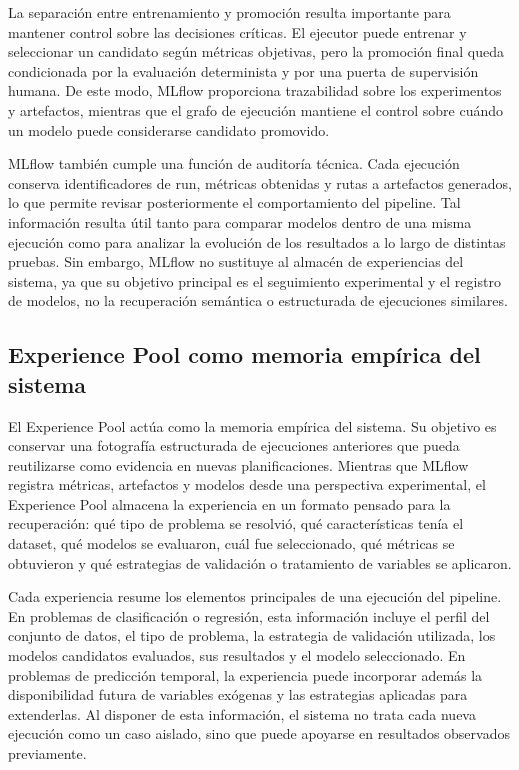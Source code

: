 \documentclass[12pt,a4paper]{article}
\theoremstyle{plain}
\begin{document}
La separación entre entrenamiento y promoción resulta importante para mantener control sobre las decisiones críticas. El ejecutor puede entrenar y seleccionar un candidato según métricas objetivas, pero la promoción final queda condicionada por la evaluación determinista y por una puerta de supervisión humana. De este modo, MLflow proporciona trazabilidad sobre los experimentos y artefactos, mientras que el grafo de ejecución mantiene el control sobre cuándo un modelo puede considerarse candidato promovido.

MLflow también cumple una función de auditoría técnica. Cada ejecución conserva identificadores de run, métricas obtenidas y rutas a artefactos generados, lo que permite revisar posteriormente el comportamiento del pipeline. Tal información resulta útil tanto para comparar modelos dentro de una misma ejecución como para analizar la evolución de los resultados a lo largo de distintas pruebas. Sin embargo, MLflow no sustituye al almacén de experiencias del sistema, ya que su objetivo principal es el seguimiento experimental y el registro de modelos, no la recuperación semántica o estructurada de ejecuciones similares.

\subsection{Experience Pool como memoria empírica del sistema}
\label{sec:experience-pool-arquitectura}

El Experience Pool actúa como la memoria empírica del sistema. Su objetivo es conservar una fotografía estructurada de ejecuciones anteriores que pueda reutilizarse como evidencia en nuevas planificaciones. Mientras que MLflow registra métricas, artefactos y modelos desde una perspectiva experimental, el Experience Pool almacena la experiencia en un formato pensado para la recuperación: qué tipo de problema se resolvió, qué características tenía el dataset, qué modelos se evaluaron, cuál fue seleccionado, qué métricas se obtuvieron y qué estrategias de validación o tratamiento de variables se aplicaron.

Cada experiencia resume los elementos principales de una ejecución del pipeline. En problemas de clasificación o regresión, esta información incluye el perfil del conjunto de datos, el tipo de problema, la estrategia de validación utilizada, los modelos candidatos evaluados, sus resultados y el modelo seleccionado. En problemas de predicción temporal, la experiencia puede incorporar además la disponibilidad futura de variables exógenas y las estrategias aplicadas para extenderlas. Al disponer de esta información, el sistema no trata cada nueva ejecución como un caso aislado, sino que puede apoyarse en resultados observados previamente. %
\end{document}

